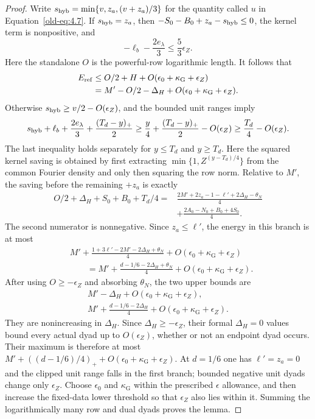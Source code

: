 \begin{proof}
Write $s_{\rm hyb}=\min\{v,z_a,(v+z_a)/3\}$ for the quantity
called $u$ in Equation~\eqref{old-eq:4.7}.  If $s_{\rm hyb}=z_a$,
then $-S_0-B_0+z_a-s_{\rm hyb}\le0$, the kernel term is
nonpositive, and
\[
 -\ell_b-\frac{2e_\lambda}{3}\le\frac53\epsilon_Z.
\]
Here the standalone $O$ is the powerful-row logarithmic length.  It follows that
\[
 \begin{aligned}
 E_{\rm ref}&\le O/2+H+O(\epsilon_0+\kappa_{\mathrm G}+\epsilon_Z)\\
 &=M'-O/2-\Delta_H+O(\epsilon_0+\kappa_{\mathrm G}+\epsilon_Z).
 \end{aligned}
\]
Otherwise $s_{\rm hyb}\ge v/2-O(\epsilon_Z)$, and the bounded unit
ranges imply
\[
 s_{\rm hyb}+\ell_b+\frac{2e_\lambda}{3}
       +\frac{(T_d-y)_+}{2}
 \ge \frac y4+\frac{(T_d-y)_+}{2}-O(\epsilon_Z)
 \ge \frac{T_d}{4}-O(\epsilon_Z).
\]
The last inequality holds separately for $y\le T_d$ and $y\ge T_d$.
Here the squared kernel saving is obtained by first extracting
$\min\{1,Z^{(y-T_d)/4}\}$ from the common Fourier density and only
then squaring the row norm.  Relative to $M'$, the saving
before the remaining $+z_a$ is exactly
\begin{equation}
 \begin{split}
 O/2+\Delta_H+S_0+B_0+T_d/4
 ={}&\frac{2M'+2z_a-1-\ell'+2\Delta_H-\theta_N}{4}\\
    &+\frac{2A_0-N_0+B_0+4S_0}{4}.
 \end{split}
 \label{old-eq:5.3}
\end{equation}
The second numerator is nonnegative.  Since $z_a\le\ell'$, the
energy in this branch is at most
\[
 \begin{aligned}
 &M'+\frac{1+3\ell'-2M'-2\Delta_H+\theta_N}{4}
       +O(\epsilon_0+\kappa_{\mathrm G}+\epsilon_Z)\\
 &\qquad=M'+\frac{d-1/6-2\Delta_H+\theta_N}{4}
       +O(\epsilon_0+\kappa_{\mathrm G}+\epsilon_Z).
 \end{aligned}
\]
After using $O\ge-\epsilon_Z$ and absorbing $\theta_N$, the two
upper bounds are
\[
 \begin{gathered}
 M'-\Delta_H+O(\epsilon_0+\kappa_{\mathrm G}+\epsilon_Z),\\
 M'+\frac{d-1/6-2\Delta_H}{4}
       +O(\epsilon_0+\kappa_{\mathrm G}+\epsilon_Z).
 \end{gathered}
\]
They are nonincreasing in $\Delta_H$.  Since
$\Delta_H\ge-\epsilon_Z$, their formal $\Delta_H=0$ values bound
every actual dyad up to $O(\epsilon_Z)$, whether or not an endpoint
dyad occurs.  Their maximum is therefore at most
$M'+((d-1/6)/4)_++O(\epsilon_0+\kappa_{\mathrm G}+\epsilon_Z)$.
At $d=1/6$ one has $\ell'=z_a=0$ and the clipped unit range falls
in the first branch; bounded negative unit dyads change only
$\epsilon_Z$.  Choose $\epsilon_0$ and $\kappa_{\mathrm G}$ within the prescribed
$\epsilon$ allowance, and then increase the fixed-data lower
threshold so that $\epsilon_Z$ also lies within it.  Summing the
logarithmically many row and dual dyads proves the lemma.
\end{proof}

